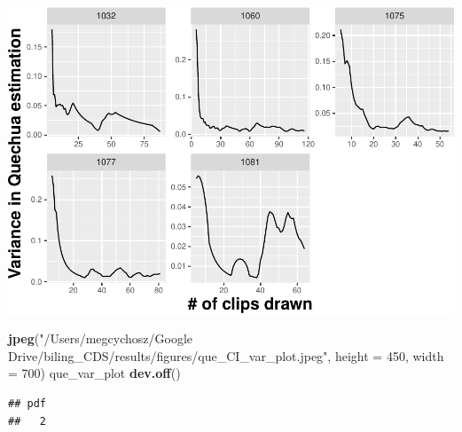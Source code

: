 \documentclass[
]{article}
\newenvironment{Shaded}{\begin{snugshade}}{\end{snugshade}}
\newcommand{\DataTypeTok}[1]{\textcolor[rgb]{0.13,0.29,0.53}{#1}}
\newcommand{\DecValTok}[1]{\textcolor[rgb]{0.00,0.00,0.81}{#1}}
\newcommand{\KeywordTok}[1]{\textcolor[rgb]{0.13,0.29,0.53}{\textbf{#1}}}
\newcommand{\NormalTok}[1]{#1}
\newcommand{\StringTok}[1]{\textcolor[rgb]{0.31,0.60,0.02}{#1}}
\begin{document}
\includegraphics{validation_results_files/figure-latex/plot rolling Quechua variances for Bolivia-1.pdf}

\begin{Shaded}
\begin{Highlighting}[]
\KeywordTok{jpeg}\NormalTok{(}\StringTok{"/Users/megcychosz/Google Drive/biling_CDS/results/figures/que_CI_var_plot.jpeg"}\NormalTok{, }\DataTypeTok{height =} \DecValTok{450}\NormalTok{, }\DataTypeTok{width =} \DecValTok{700}\NormalTok{)}
\NormalTok{que_var_plot}
\KeywordTok{dev.off}\NormalTok{()}
\end{Highlighting}
\end{Shaded}

\begin{verbatim}
## pdf 
##   2
\end{verbatim}
\end{document}

